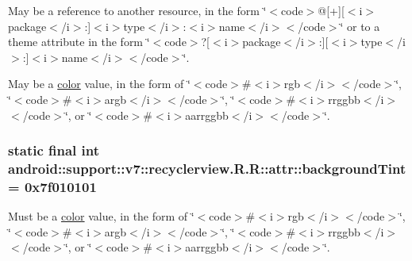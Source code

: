 May be a reference to another resource, in the form \char`\"{}$<$code$>$@\mbox{[}+\mbox{]}\mbox{[}$<$i$>$package$<$/i$>$:\mbox{]}$<$i$>$type$<$/i$>$:$<$i$>$name$<$/i$>$$<$/code$>$\char`\"{} or to a theme attribute in the form \char`\"{}$<$code$>$?\mbox{[}$<$i$>$package$<$/i$>$:\mbox{]}\mbox{[}$<$i$>$type$<$/i$>$:\mbox{]}$<$i$>$name$<$/i$>$$<$/code$>$\char`\"{}. 

May be a \hyperlink{classandroid_1_1support_1_1v7_1_1recyclerview_1_1_r_1_1color}{color} value, in the form of \char`\"{}$<$code$>$\#$<$i$>$rgb$<$/i$>$$<$/code$>$\char`\"{}, \char`\"{}$<$code$>$\#$<$i$>$argb$<$/i$>$$<$/code$>$\char`\"{}, \char`\"{}$<$code$>$\#$<$i$>$rrggbb$<$/i$>$$<$/code$>$\char`\"{}, or \char`\"{}$<$code$>$\#$<$i$>$aarrggbb$<$/i$>$$<$/code$>$\char`\"{}. \hypertarget{classandroid_1_1support_1_1v7_1_1recyclerview_1_1_r_1_1attr_d5999a69d966aa97a8de516095e0b68d}{
\subsubsection[{backgroundTint}]{\setlength{\rightskip}{0pt plus 5cm}static final int android::support::v7::recyclerview.R.R::attr::backgroundTint = 0x7f010101}}
\label{classandroid_1_1support_1_1v7_1_1recyclerview_1_1_r_1_1attr_d5999a69d966aa97a8de516095e0b68d}


Must be a \hyperlink{classandroid_1_1support_1_1v7_1_1recyclerview_1_1_r_1_1color}{color} value, in the form of \char`\"{}$<$code$>$\#$<$i$>$rgb$<$/i$>$$<$/code$>$\char`\"{}, \char`\"{}$<$code$>$\#$<$i$>$argb$<$/i$>$$<$/code$>$\char`\"{}, \char`\"{}$<$code$>$\#$<$i$>$rrggbb$<$/i$>$$<$/code$>$\char`\"{}, or \char`\"{}$<$code$>$\#$<$i$>$aarrggbb$<$/i$>$$<$/code$>$\char`\"{}. 

